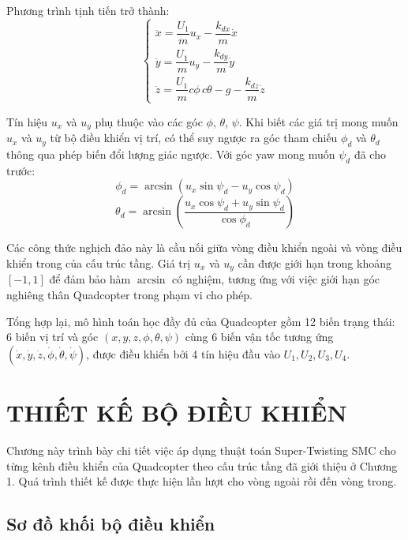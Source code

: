 \documentclass[12pt,a4paper]{report}
\begin{document}
Phương trình tịnh tiến trở thành:
\begin{equation}
\begin{cases}
\ddot{x} = \dfrac{U_1}{m} u_x - \dfrac{k_{dx}}{m} \dot{x} \\[10pt]
\ddot{y} = \dfrac{U_1}{m} u_y - \dfrac{k_{dy}}{m} \dot{y} \\[10pt]
\ddot{z} = \dfrac{U_1}{m} c\phi \, c\theta - g - \dfrac{k_{dz}}{m} \dot{z}
\end{cases}
\end{equation}

Tín hiệu $u_x$ và $u_y$ phụ thuộc vào các góc $\phi$, $\theta$, $\psi$. Khi biết các giá trị mong muốn $u_x$ và $u_y$ từ bộ điều khiển vị trí, có thể suy ngược ra góc tham chiếu $\phi_d$ và $\theta_d$ thông qua phép biến đổi lượng giác ngược. Với góc yaw mong muốn $\psi_d$ đã cho trước:
\begin{equation}
\phi_d = \arcsin(u_x \sin\psi_d - u_y \cos\psi_d)
\end{equation}
\begin{equation}
\theta_d = \arcsin\left(\frac{u_x \cos\psi_d + u_y \sin\psi_d}{\cos\phi_d}\right)
\end{equation}

Các công thức nghịch đảo này là cầu nối giữa vòng điều khiển ngoài và vòng điều khiển trong của cấu trúc tầng. Giá trị $u_x$ và $u_y$ cần được giới hạn trong khoảng $[-1, 1]$ để đảm bảo hàm $\arcsin$ có nghiệm, tương ứng với việc giới hạn góc nghiêng thân Quadcopter trong phạm vi cho phép.

Tổng hợp lại, mô hình toán học đầy đủ của Quadcopter gồm 12 biến trạng thái: 6 biến vị trí và góc $(x, y, z, \phi, \theta, \psi)$ cùng 6 biến vận tốc tương ứng $(\dot{x}, \dot{y}, \dot{z}, \dot{\phi}, \dot{\theta}, \dot{\psi})$, được điều khiển bởi 4 tín hiệu đầu vào $U_1, U_2, U_3, U_4$.

\chapter{THIẾT KẾ BỘ ĐIỀU KHIỂN}

Chương này trình bày chi tiết việc áp dụng thuật toán Super-Twisting SMC cho từng kênh điều khiển của Quadcopter theo cấu trúc tầng đã giới thiệu ở Chương 1. Quá trình thiết kế được thực hiện lần lượt cho vòng ngoài rồi đến vòng trong.
\section{Sơ đồ khối bộ điều khiển}
\end{document}
